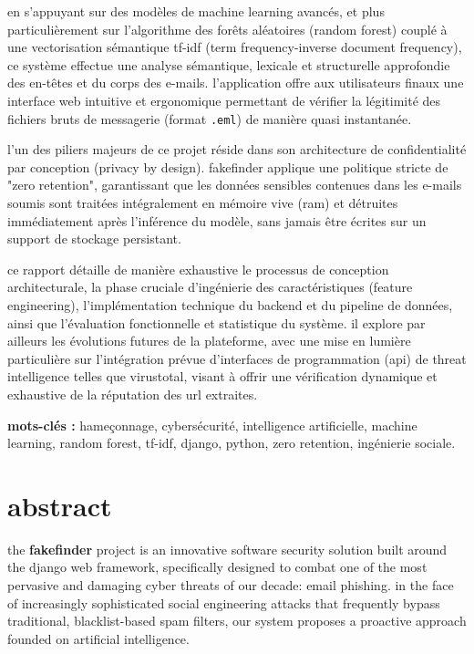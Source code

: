 \documentclass[12pt,a4paper]{report}
\begin{document}
en s'appuyant sur des modèles de machine learning avancés, et plus particulièrement sur l'algorithme des forêts aléatoires (random forest) couplé à une vectorisation sémantique tf-idf (term frequency-inverse document frequency), ce système effectue une analyse sémantique, lexicale et structurelle approfondie des en-têtes et du corps des e-mails. l'application offre aux utilisateurs finaux une interface web intuitive et ergonomique permettant de vérifier la légitimité des fichiers bruts de messagerie (format \texttt{.eml}) de manière quasi instantanée. 

l'un des piliers majeurs de ce projet réside dans son architecture de confidentialité par conception (privacy by design). fakefinder applique une politique stricte de "zero retention", garantissant que les données sensibles contenues dans les e-mails soumis sont traitées intégralement en mémoire vive (ram) et détruites immédiatement après l'inférence du modèle, sans jamais être écrites sur un support de stockage persistant.

ce rapport détaille de manière exhaustive le processus de conception architecturale, la phase cruciale d'ingénierie des caractéristiques (feature engineering), l'implémentation technique du backend et du pipeline de données, ainsi que l'évaluation fonctionnelle et statistique du système. il explore par ailleurs les évolutions futures de la plateforme, avec une mise en lumière particulière sur l'intégration prévue d'interfaces de programmation (api) de threat intelligence telles que virustotal, visant à offrir une vérification dynamique et exhaustive de la réputation des url extraites.

\textbf{mots-clés :} hameçonnage, cybersécurité, intelligence artificielle, machine learning, random forest, tf-idf, django, python, zero retention, ingénierie sociale.

\vspace{1cm}

\chapter*{abstract}

the \textbf{fakefinder} project is an innovative software security solution built around the django web framework, specifically designed to combat one of the most pervasive and damaging cyber threats of our decade: email phishing. in the face of increasingly sophisticated social engineering attacks that frequently bypass traditional, blacklist-based spam filters, our system proposes a proactive approach founded on artificial intelligence.
\end{document}
